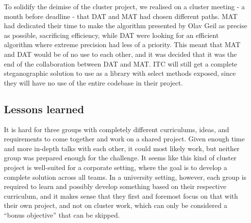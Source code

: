 To solidify the deimise of the cluster project, we realised on a cluster meeting - a month before deadline - that DAT and MAT had chosen different paths.
MAT had dedicated their time to make the algorithm presented by Olav Geil as precise as possible, sacrificing efficiency, while DAT were looking for an efficient algorithm where extreme precision had less of a priority.
This meant that MAT and DAT would be of no use to each other, and it was decided that it was the end of the collaboration between DAT and MAT.
ITC will still get a complete steganographic solution to use as a library with select methods exposed, since they will have no use of the entire codebase in their project.

\subsection{Lessons learned}
It is hard for three groups with completely different curriculums, ideas, and requirements to come together and work on a shared project.
Given enough time and more in-depth talks with each other, it could most likely work, but neither group was prepared enough for the challenge.
It seems like this kind of cluster project is well-suited for a corporate setting, where the goal is to develop a complete solution across all teams.
In a university setting, however, each group is required to learn and possibly develop something based on their respective curriculum, and it makes sense that they first and foremost focus on that with their own project, and not on cluster work, which can only be considered a ``bonus objective'' that can be skipped.

